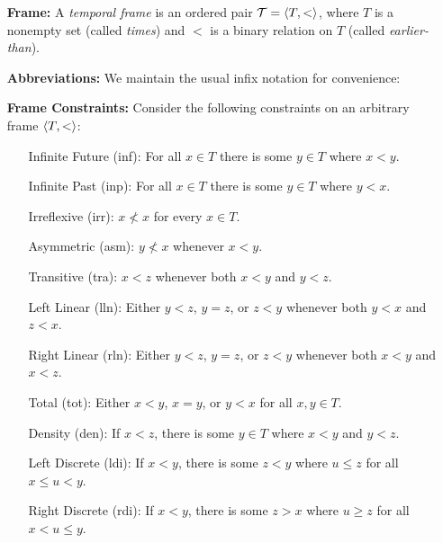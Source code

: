 \documentclass[a4paper, 11pt]{article} %
\begin{document}
\begin{enumerate}[leftmargin=1.2in] %
  \item[\bf Frame:] A \textit{temporal frame} is an ordered pair $\mathcal{T} = \langle T,<\rangle$, where $T$ is a nonempty set (called \textit{times}) and $<$ is a binary relation on $T$ (called \textit{earlier-than}).
  \item[\bf Abbreviations:] We maintain the usual infix notation for convenience:
    \begin{itemize}
    \end{itemize}
  \item[\bf Frame Constraints:]
    Consider the following constraints on an arbitrary frame $\langle T, <\rangle$:
    \begin{itemize}
      \item[\sc Infinite Future (inf):] For all $x \in T$ there is some $y \in T$ where $x < y$.
      \item[\sc Infinite Past (inp):] For all $x \in T$ there is some $y \in T$ where $y < x$.
      \item[\sc Irreflexive (irr):] $x \nless x$ for every $x\in T$.
      \item[\sc Asymmetric (asm):] $y \nless x$ whenever $x < y$. 
      \item[\sc Transitive (tra):] $x < z$ whenever both $x < y$ and $y < z$. 
      \item[\sc Left Linear (lln):] Either $y < z$, $y = z$, or $z < y$ whenever both $y < x$ and $z < x$. 
      \item[\sc Right Linear (rln):] Either $y < z$, $y = z$, or $z < y$ whenever both $x < y$ and $x < z$.
      \item[\sc Total (tot):] Either $x < y$, $x = y$, or $y < x$ for all $x,y \in T$. 
      \item[\sc Density (den):] If $x < z$, there is some $y \in T$ where $x < y$ and $y < z$. 
      \item[\sc Left Discrete (ldi):] If $x < y$, there is some $z < y$ where $u \leq z$ for all $x \leq u < y$. 
      \item[\sc Right Discrete (rdi):] If $x < y$, there is some $z > x$ where $u \geq z$ for all $x < u \leq y$. 
    \end{itemize}
\end{enumerate}
\end{document}
